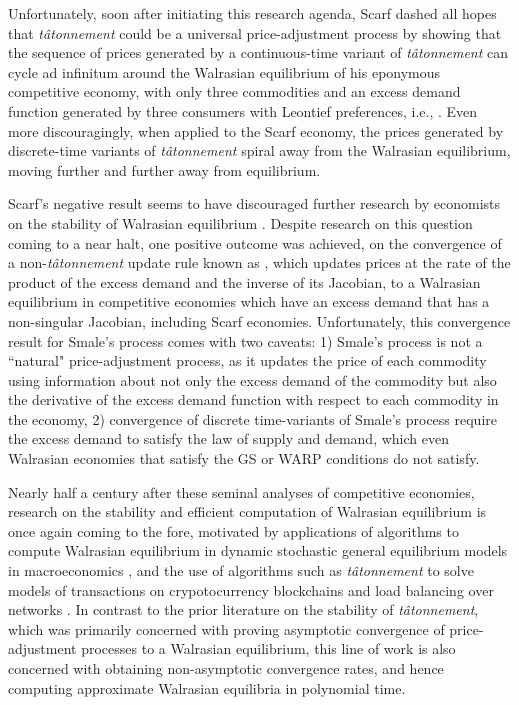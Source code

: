 Unfortunately, soon after initiating this research agenda, Scarf dashed all hopes that \emph{t\^atonnement\/} could be a universal price-adjustment process by showing that the sequence of prices generated by a continuous-time variant of \emph{t\^atonnement\/} can cycle ad infinitum around the Walrasian equilibrium of his eponymous competitive economy, with only three commodities and an excess demand function generated by three consumers with Leontief preferences, i.e.,  \cite{scarf1960instable}. Even more discouragingly, when applied to the Scarf economy, the prices generated by discrete-time variants of \emph{t\^atonnement\/} spiral away from the Walrasian equilibrium, moving further and further away from equilibrium.

Scarf's negative result seems to have discouraged further research by economists on the stability of Walrasian equilibrium \cite{fisher1975stability}.
Despite research on this question coming to a near halt, one positive outcome was achieved, on the convergence of a non-\emph{t\^atonnement\/} update rule known as  \cite{herings1997globally, kamiya1990globally, van1987convergent, smale1976convergent}, which updates prices at the rate of the product of the excess demand and the inverse of its Jacobian, to a Walrasian equilibrium in competitive economies which have an excess demand that has a non-singular Jacobian, including Scarf economies. Unfortunately, this convergence result for Smale's process comes with two caveats: 1) Smale's process is not a ``natural" price-adjustment process, as it updates the price of each commodity using information about not only the excess demand of the commodity but also
the derivative of the excess demand function with respect to each commodity in the economy, 2) convergence of discrete time-variants of Smale's process require the excess demand to satisfy the law of supply and demand, which even Walrasian economies that satisfy the GS or WARP conditions do not satisfy. 

Nearly half a century after these seminal analyses of competitive economies, research on the stability and efficient computation of Walrasian equilibrium is once again coming to the fore, motivated by applications of algorithms to compute Walrasian equilibrium in dynamic stochastic general equilibrium models in macroeconomics \cite{geanakoplos1990introduction,sargent2000recursive,taylor1999handbook,FernandezVillaverde2023CompMethodsMacro}, and the use of algorithms such as \emph{t\^atonnement\/} to solve models of transactions on crypotocurrency blockchains \cite{leonardos2021dynamical, liu2022empirical, reijsbergen2021transaction} and load balancing over networks \cite{jain2013constrained}.
In contrast to the prior literature on the stability of \emph{t\^atonnement}, which was primarily concerned with proving asymptotic convergence of price-adjustment processes to a Walrasian equilibrium, this line of work is also concerned with obtaining non-asymptotic convergence rates, and hence computing approximate Walrasian equilibria in polynomial time.

